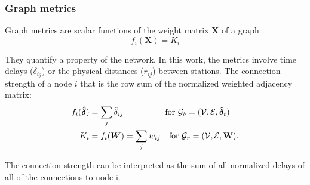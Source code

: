 \documentclass[12pt, sumlimits, intlimits]{article}
\begin{document}
\subsubsection{Graph metrics}
Graph metrics are scalar functions of the weight matrix $\bm{X}$ of a graph 
\begin{equation}
f_i(\bm{X})=K_i
\label{eq:metrics}
\end{equation}

They quantify a property of the network. In this work, the metrics involve time delays ($\delta_{ij}$) or the physical distances ($r_{ij}$) between stations. The connection strength of a node $i$ that is the row sum of the normalized weighted adjacency matrix: 
\begin{align}
f_i(\bm{\hat{\delta}})&=\sum_j\hat{\delta}_{ij} \quad \quad \quad \quad \quad \text{for }  \mathcal{G}_{\delta} = (\mathcal{V}, \mathcal{E}, \bm{\hat{\delta}}_t) \\
K_i &= f_i (\bm{W})= \sum_j{w_{ij}}  \quad \text{for }  \mathcal{G}_{r} = (\mathcal{V}, \mathcal{E}, \bf{W}).
\end{align}

The connection strength can be interpreted as the sum of all normalized delays of all of the connections to node i.

%
\end{document}
